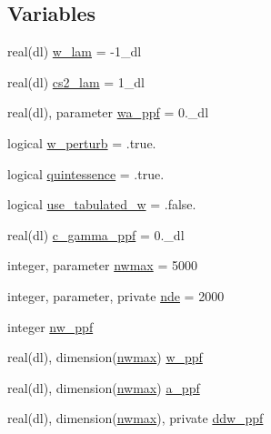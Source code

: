 \subsection*{Variables}
\begin{DoxyCompactItemize}
\item 
real(dl) \mbox{\hyperlink{namespacelambdageneral_aa974593ba987c77d2bf09655570fab6a}{w\+\_\+lam}} = -\/1\+\_\+dl
\item 
real(dl) \mbox{\hyperlink{namespacelambdageneral_a5df860ac945ff458c8f809a63ea3987f}{cs2\+\_\+lam}} = 1\+\_\+dl
\item 
real(dl), parameter \mbox{\hyperlink{namespacelambdageneral_a175aaf4fc2698fa3d615510feb82f3ee}{wa\+\_\+ppf}} = 0.\+\_\+dl
\item 
logical \mbox{\hyperlink{namespacelambdageneral_aaccd65e521dd501c9ee6c8e77a95ffef}{w\+\_\+perturb}} = .true.
\item 
logical \mbox{\hyperlink{namespacelambdageneral_a089643a9b64fa595564ae2a20a525c0a}{quintessence}} = .true.
\item 
logical \mbox{\hyperlink{namespacelambdageneral_af7e90af593ee4c5594024dff73234360}{use\+\_\+tabulated\+\_\+w}} = .false.
\item 
real(dl) \mbox{\hyperlink{namespacelambdageneral_a85e391fa1c34171d68cc178f0d0b9d8a}{c\+\_\+gamma\+\_\+ppf}} = 0.\+\_\+dl
\item 
integer, parameter \mbox{\hyperlink{namespacelambdageneral_a72ab4fcacd74a66fe577794d5294864b}{nwmax}} = 5000
\item 
integer, parameter, private \mbox{\hyperlink{namespacelambdageneral_ae21da0c8fff86159b789dee9579bd7d5}{nde}} = 2000
\item 
integer \mbox{\hyperlink{namespacelambdageneral_ab52783406de69e4d228acb0d9fefc1c6}{nw\+\_\+ppf}}
\item 
real(dl), dimension(\mbox{\hyperlink{namespacelambdageneral_a72ab4fcacd74a66fe577794d5294864b}{nwmax}}) \mbox{\hyperlink{namespacelambdageneral_a7e860fa5106918f839ea3f7f76862f56}{w\+\_\+ppf}}
\item 
real(dl), dimension(\mbox{\hyperlink{namespacelambdageneral_a72ab4fcacd74a66fe577794d5294864b}{nwmax}}) \mbox{\hyperlink{namespacelambdageneral_a01ecf8d62de8dba202404c6c64743084}{a\+\_\+ppf}}
\item 
real(dl), dimension(\mbox{\hyperlink{namespacelambdageneral_a72ab4fcacd74a66fe577794d5294864b}{nwmax}}), private \mbox{\hyperlink{namespacelambdageneral_abf25efe08b2d793e499129d1bbd0ad61}{ddw\+\_\+ppf}}
\item 

\end{DoxyCompactItemize}
